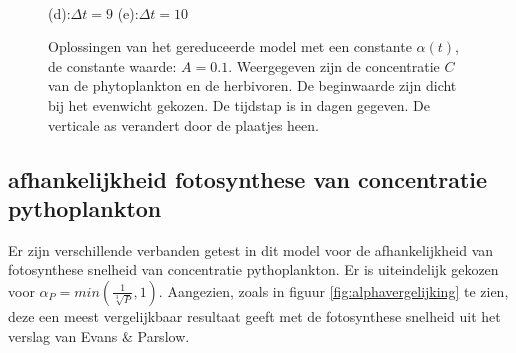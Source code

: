 \begin{figure}[H]
{    }
  \\
  \hspace{0.11\textwidth}(d):$\Delta t=9$ \hspace{0.47\textwidth} (e):$\Delta t=10$\hspace{0.1\textwidth}
  \centering
  \caption{Oplossingen van het gereduceerde model met een constante $\alpha(t)$, de constante waarde: $A=0.1$. Weergegeven zijn de concentratie $C$ van de phytoplankton en de herbivoren. De beginwaarde zijn dicht bij het evenwicht gekozen. De tijdstap is in dagen gegeven. De verticale as verandert door de plaatjes heen. }
  \label{fig:voorbeelden1}
\end{figure} 

\newpage

\subsection*{afhankelijkheid fotosynthese van concentratie pythoplankton}

Er zijn verschillende verbanden getest in dit model voor de  afhankelijkheid van fotosynthese snelheid van concentratie pythoplankton. Er is uiteindelijk gekozen voor $\alpha_P=min(\frac{1}{\sqrt[3]{P}},1)$. Aangezien, zoals in figuur \ref{fig:alphavergelijking} te zien, deze een meest vergelijkbaar resultaat geeft met de fotosynthese snelheid uit het verslag van Evans \& Parslow. 

